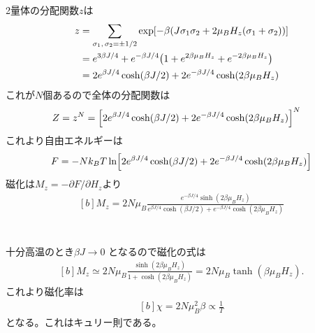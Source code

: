 \documentclass[../../master.tex]{subfiles}
\begin{document}
\section{}
2量体の分配関数\(z\)は
\begin{equation}\begin{aligned}[b]
    z &= \sum_{\sigma_1,\,\sigma_2 = \pm 1/2}\exp[-\beta\qty(J\sigma_1\sigma_2 +2\mu_B H_z(\sigma_1+\sigma_2))]\\
    &= e^{3\beta J/4}+e^{-\beta J/4}\qty(1+e^{2\beta \mu_B H_z}+e^{-2\beta \mu_B H_z})\\
    &= 2e^{\beta J/4}\cosh(\beta J/2)+2e^{-\beta J/4}\cosh(2\beta\mu_BH_z)
\end{aligned}\end{equation}
これが\(N\)個あるので全体の分配関数は
\begin{equation}\begin{aligned}[b]
    Z &= z^N = \Bigl[2e^{\beta J/4}\cosh(\beta J/2)+2e^{-\beta J/4}\cosh(2\beta\mu_BH_z)\Bigr]^N
\end{aligned}\end{equation}
これより自由エネルギーは
\begin{equation}\begin{aligned}[b]
    F = - Nk_B T \ln\Bigl[2e^{\beta J/4}\cosh(\beta J/2)+2e^{-\beta J/4}\cosh(2\beta\mu_BH_z)\Bigr]
\end{aligned}\end{equation}
磁化は\(M_z = -\partial F/\partial H_z\)より
\begin{equation}\begin{aligned}[b]
    M_z = 2N\mu_B\frac{e^{-\beta J/4}\sinh(2\beta\mu_BH_z)}{e^{\beta J/4}\cosh(\beta J/2)+e^{-\beta J/4}\cosh(2\beta\mu_BH_z)}
\end{aligned}\end{equation}
\section{}
十分高温のとき\(\beta J \to 0\) となるので磁化の式は
\begin{equation}\begin{aligned}[b]
    M_z \simeq 2N\mu_B\frac{\sinh(2\beta\mu_BH_z)}{1+\cosh(2\beta\mu_BH_z)}
    = 2N\mu_B \tanh(\beta\mu_B H_z).
\end{aligned}\end{equation}
これより磁化率は
\begin{equation}\begin{aligned}[b]
    \chi = 2N\mu_B^2\beta \propto \frac{1}{T}
\end{aligned}\end{equation}
となる。これはキュリー則である。
\end{document}
